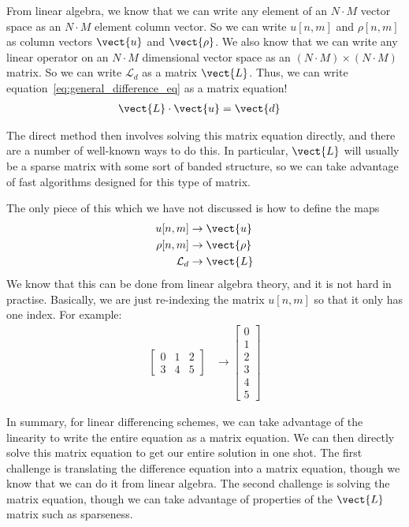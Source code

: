 \documentclass[twocolumn]{myarticle}
\newcommand{\mat}[1]{\begin{bmatrix}#1\end{bmatrix}}
\begin{document}
From linear algebra, we know that we can write any element of an $ N \cdot M $ vector space as an $ N\cdot M $ element column vector.
So we can write $ u[n,m] $ and $ \rho[n,m] $ as column vectors $ \vect{u} $ and $ \vect{\rho} $.
We also know that we can write any linear operator on an $ N \cdot M $ dimensional vector space as an $ \left( N \cdot M \right) \times \left( N \cdot M \right) $ matrix.
So we can write $ \mathcal{L}_d $ as a matrix $ \vect{L} $.
Thus, we can write equation~\eqref{eq:general_difference_eq} as a matrix equation!
\begin{align}
    \vect{L} \cdot \vect{u} &= \vect{d}
\end{align}

The direct method then involves solving this matrix equation directly, and there are a number of well-known ways to do this.
In particular, $ \vect{L} $ will usually be a sparse matrix with some sort of banded structure, so we can take advantage of fast algorithms designed for this type of matrix.

The only piece of this which we have not discussed is how to define the maps
\begin{align}
    u[n,m] &\to \vect{u}
    \\
    \rho[n,m] &\to \vect{\rho}
    \\
    \mathcal{L}_d &\to \vect{L}
\end{align}
We know that this can be done from linear algebra theory, and it is not hard in practise.
Basically, we are just re-indexing the matrix $ u[n,m] $ so that it only has one index.
For example:
\begin{align}
    \mat{0 & 1 & 2 \\ 3 & 4 & 5 } &\to \mat{0 \\ 1 \\ 2 \\ 3 \\ 4 \\ 5 }
\end{align}

In summary, for linear differencing schemes, we can take advantage of the linearity to write the entire equation as a matrix equation.
We can then directly solve this matrix equation to get our entire solution in one shot.
The first challenge is translating the difference equation into a matrix equation, though we know that we can do it from linear algebra.
The second challenge is solving the matrix equation, though we can take advantage of properties of the $ \vect{L} $ matrix such as sparseness.
\end{document}
